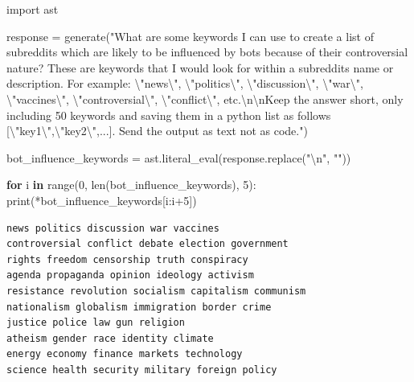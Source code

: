 \documentclass[
  12pt,
  letterpaper,
  DIV=11,
  numbers=noendperiod]{scrartcl}
\newenvironment{Shaded}{\begin{snugshade}}{\end{snugshade}}
\newcommand{\BuiltInTok}[1]{\textcolor[rgb]{0.00,0.23,0.31}{#1}}
\newcommand{\CharTok}[1]{\textcolor[rgb]{0.13,0.47,0.30}{#1}}
\newcommand{\ControlFlowTok}[1]{\textcolor[rgb]{0.00,0.23,0.31}{\textbf{#1}}}
\newcommand{\DecValTok}[1]{\textcolor[rgb]{0.68,0.00,0.00}{#1}}
\newcommand{\ImportTok}[1]{\textcolor[rgb]{0.00,0.46,0.62}{#1}}
\newcommand{\KeywordTok}[1]{\textcolor[rgb]{0.00,0.23,0.31}{\textbf{#1}}}
\newcommand{\NormalTok}[1]{\textcolor[rgb]{0.00,0.23,0.31}{#1}}
\newcommand{\OperatorTok}[1]{\textcolor[rgb]{0.37,0.37,0.37}{#1}}
\newcommand{\StringTok}[1]{\textcolor[rgb]{0.13,0.47,0.30}{#1}}
\begin{document}
\begin{Shaded}
\begin{Highlighting}[]
\ImportTok{import}\NormalTok{ ast}

\NormalTok{response }\OperatorTok{=}\NormalTok{ generate(}\StringTok{"What are some keywords I can use to create a list of subreddits which are likely to be influenced by bots because of their controversial nature? These are keywords that I would look for within a subreddit\textquotesingle{}s name or description. For example: }\CharTok{\textbackslash{}"}\StringTok{news}\CharTok{\textbackslash{}"}\StringTok{, }\CharTok{\textbackslash{}"}\StringTok{politics}\CharTok{\textbackslash{}"}\StringTok{, }\CharTok{\textbackslash{}"}\StringTok{discussion}\CharTok{\textbackslash{}"}\StringTok{, }\CharTok{\textbackslash{}"}\StringTok{war}\CharTok{\textbackslash{}"}\StringTok{, }\CharTok{\textbackslash{}"}\StringTok{vaccines}\CharTok{\textbackslash{}"}\StringTok{, }\CharTok{\textbackslash{}"}\StringTok{controversial}\CharTok{\textbackslash{}"}\StringTok{, }\CharTok{\textbackslash{}"}\StringTok{conflict}\CharTok{\textbackslash{}"}\StringTok{, etc.}\CharTok{\textbackslash{}n\textbackslash{}n}\StringTok{Keep the answer short, only including 50 keywords and saving them in a python list as follows [}\CharTok{\textbackslash{}"}\StringTok{key1}\CharTok{\textbackslash{}"}\StringTok{,}\CharTok{\textbackslash{}"}\StringTok{key2}\CharTok{\textbackslash{}"}\StringTok{,...]. Send the output as text not as code."}\NormalTok{)}

\NormalTok{bot\_influence\_keywords }\OperatorTok{=}\NormalTok{ ast.literal\_eval(response.replace(}\StringTok{"}\CharTok{\textbackslash{}n}\StringTok{"}\NormalTok{, }\StringTok{""}\NormalTok{))}

\ControlFlowTok{for}\NormalTok{ i }\KeywordTok{in} \BuiltInTok{range}\NormalTok{(}\DecValTok{0}\NormalTok{, }\BuiltInTok{len}\NormalTok{(bot\_influence\_keywords), }\DecValTok{5}\NormalTok{):}
    \BuiltInTok{print}\NormalTok{(}\OperatorTok{*}\NormalTok{bot\_influence\_keywords[i:i}\OperatorTok{+}\DecValTok{5}\NormalTok{])}
\end{Highlighting}
\end{Shaded}

\begin{verbatim}
news politics discussion war vaccines
controversial conflict debate election government
rights freedom censorship truth conspiracy
agenda propaganda opinion ideology activism
resistance revolution socialism capitalism communism
nationalism globalism immigration border crime
justice police law gun religion
atheism gender race identity climate
energy economy finance markets technology
science health security military foreign policy
\end{verbatim}
\end{document}

